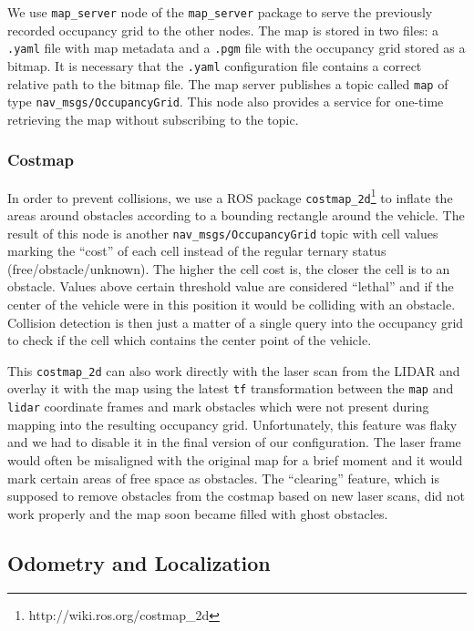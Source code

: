 We use \verb|map_server| node of the \verb|map_server| package to serve the previously recorded occupancy grid to the other nodes. The map is stored in two files: a \verb|.yaml| file with map metadata and a \verb|.pgm| file with the occupancy grid stored as a bitmap. It is necessary that the \verb|.yaml| configuration file contains a correct relative path to the bitmap file. The map server publishes a topic called \verb|map| of type \verb|nav_msgs/OccupancyGrid|. This node also provides a service for one-time retrieving the map without subscribing to the topic.

\subsubsection{Costmap} In order to prevent collisions, we use a \gls*{ROS} package \verb|costmap_2d|\footnote{http://wiki.ros.org/costmap\_2d} to inflate the areas around obstacles according to a bounding rectangle around the vehicle. The result of this node is another \verb|nav_msgs/OccupancyGrid| topic with cell values marking the ``cost'' of each cell instead of the regular ternary status (free/obstacle/unknown). The higher the cell cost is, the closer the cell is to an obstacle. Values above certain threshold value are considered ``lethal'' and if the center of the vehicle were in this position it would be colliding with an obstacle. Collision detection is then just a matter of a single query into the occupancy grid to check if the cell which contains the center point of the vehicle.

This \verb|costmap_2d| can also work directly with the laser scan from the LIDAR and overlay it with the map using the latest \verb|tf| transformation between the \verb|map| and \verb|lidar| coordinate frames and mark obstacles which were not present during mapping into the resulting occupancy grid. Unfortunately, this feature was flaky and we had to disable it in the final version of our configuration. The laser frame would often be misaligned with the original map for a brief moment and it would mark certain areas of free space as obstacles. The ``clearing'' feature, which is supposed to remove obstacles from the costmap based on new laser scans, did not work properly and the map soon became filled with ghost obstacles.

\subsection{Odometry and Localization}

